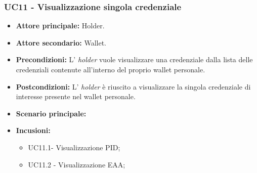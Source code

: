 \subsubsection{UC11 - Visualizzazione singola credenziale}
\begin{itemize}
\item \textbf{Attore principale:} Holder.
\item \textbf{Attore secondario:} Wallet. 
\item \textbf{Precondizioni:} L’ \textit{holder} vuole visualizzare una credenziale dalla lista delle credenziali contenute all'interno del proprio wallet personale. 
\item \textbf{Postcondizioni:} L’ \textit{holder} è riuscito a visualizzare la singola credenziale di interesse presente nel wallet personale.
\item \textbf{Scenario principale:} 
\item \textbf{Incusioni:}
    \begin{itemize}
    \item UC11.1- Visualizzazione PID;
    \item UC11.2 - Visualizzazione EAA;
    \end{itemize}
\end{itemize}

